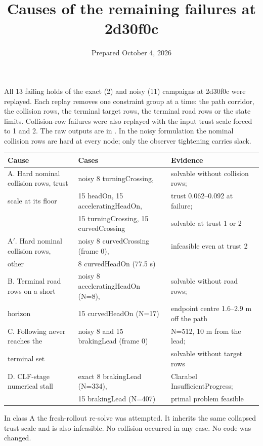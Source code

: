 \documentclass[11pt]{article}
\title{Causes of the remaining failures at 2d30f0c}
\date{Prepared October 4, 2026}
\begin{document}
\maketitle
All 13 failing holds of the exact (2) and noisy (11) campaigns at 2d30f0c were
replayed. Each replay removes one constraint group at a time: the path corridor,
the collision rows, the terminal target rows, the terminal road rows or the
state limits. Collision-row failures were also replayed with the input trust
scale forced to 1 and 2. The raw outputs are in
. In the noisy formulation the nominal
collision rows are hard at every node; only the observer tightening carries
slack.

\begin{center}
\begin{tabular}{lll}
\toprule
Cause & Cases & Evidence\\
\midrule
A. Hard nominal collision rows, trust & noisy 8 turningCrossing, & solvable without collision rows;\\
\quad scale at its floor & 15 headOn, 15 acceleratingHeadOn, & trust 0.062--0.092 at failure;\\
 & 15 turningCrossing, 15 curvedCrossing & solvable at trust 1 or 2\\
A$'$. Hard nominal collision rows, & noisy 8 curvedCrossing (frame 0), & infeasible even at trust 2\\
\quad other & 8 curvedHeadOn (77.5 s) & \\
B. Terminal road rows on a short & noisy 8 acceleratingHeadOn (N=8), & solvable without road rows;\\
\quad horizon & 15 curvedHeadOn (N=17) & endpoint centre 1.6--2.9 m off the path\\
C. Following never reaches the & noisy 8 and 15 brakingLead (frame 0) & N=512, 10 m from the lead;\\
\quad terminal set & & solvable without target rows\\
D. CLF-stage numerical stall & exact 8 brakingLead (N=334), & Clarabel InsufficientProgress;\\
 & 15 brakingLead (N=407) & primal problem feasible\\
\bottomrule
\end{tabular}
\end{center}

In class A the fresh-rollout re-solve was attempted. It inherits the same
collapsed trust scale and is also infeasible. No collision occurred in any
case. No code was changed.
\end{document}
